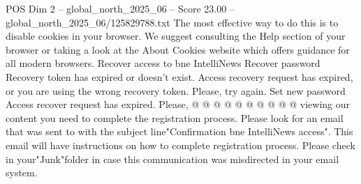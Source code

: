 \begin{textsample}{POS Dim 2 – global\_north\_2025\_06 – Score 23.00 – global\_north\_2025\_06/125829788.txt}
The most effective way to do this is to disable cookies in your browser.
We suggest consulting the Help section of your browser or taking a look at the About Cookies website which offers guidance for all modern browsers.
Recover access to bne IntelliNews Recover password Recovery token has expired or doesn't exist.
Access recovery request has expired, or you are using the wrong recovery token.
Please, try again.
Set new password Access recover request has expired.
Please, @ @ @ @ @ @ @ @ @ @ viewing our content you need to complete the registration process.
Please look for an email that was sent to with the subject line"Confirmation bne IntelliNews access".
This email will have instructions on how to complete registration process.
Please check in your"Junk"folder in case this communication was misdirected in your email system.

\end{textsample}
